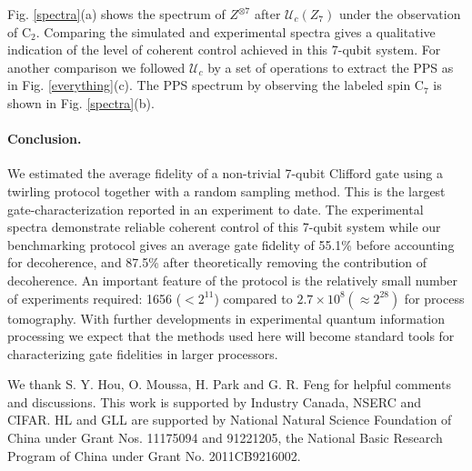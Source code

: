 \documentclass[prl,twocolumn,showpacs]{revtex4-1}
\begin{document}
 Fig. \ref{spectra}(a) shows the  spectrum of $Z^{\otimes 7}$  after  $\mathcal{U}_{c} (Z_7)$ under the observation of C$_2$. Comparing   the simulated and experimental spectra  gives a qualitative  indication of  the level of coherent control achieved in this 7-qubit system.  For another comparison we followed $\mathcal{U}_{c}$ by a set of  operations  to extract  the PPS as in Fig. \ref{everything}(c). The PPS spectrum by observing the labeled spin C$_7$ is shown in Fig. \ref{spectra}(b).

\paragraph*{Conclusion.}
We estimated  the average fidelity of a non-trivial 7-qubit Clifford gate using a twirling protocol together with a  random sampling method.  This is the largest gate-characterization reported in an experiment to date. The experimental spectra demonstrate reliable coherent control of this 7-qubit system while our benchmarking protocol gives an average gate fidelity of 55.1\% before accounting for decoherence, and 87.5\% after theoretically removing the contribution of decoherence. An important feature of the protocol is the relatively small number of experiments required: 1656 ($<2^{11}$) compared to $2.7 \times 10^8 (\approx2^{28})$ for process tomography. With further developments in experimental quantum information processing we expect that the methods used here will become standard tools for characterizing gate fidelities in larger processors.

We thank S. Y. Hou, O. Moussa, H. Park and G. R. Feng  for helpful comments and discussions. This work is supported by Industry Canada, NSERC and CIFAR. HL and GLL are supported by National Natural Science Foundation of China under Grant Nos. 11175094  and 91221205, the National Basic Research Program of China under Grant No. 2011CB9216002.
\end{document}
